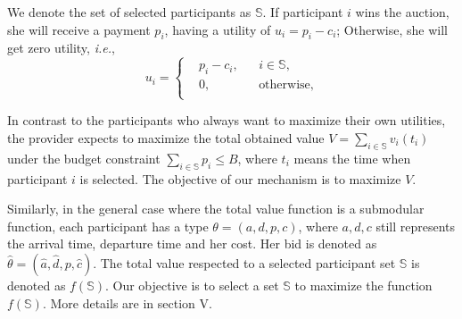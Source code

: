 \documentclass[conference,compsocconf,letterpaper,10pt]{IEEEtran}
\newcommand{\ie}{{\em i.e.}}
\begin{document}

We denote the set of selected participants as $\mathbb{S}$. If participant $i$ wins the auction, she will receive a payment $p_i$, having a utility of $u_i=p_i-c_i$; Otherwise, she will get zero utility, \ie,
\begin{equation}\label{equ:utilityfunction}
u_i=\left\{
\begin{aligned}
&p_i-c_i, & & i\in \mathbb{S},\\
&0, & & \text{otherwise},\\
\end{aligned}
\right.
\end{equation}

In contrast to the participants who always want to maximize their own utilities, the provider expects to maximize the total obtained value $V=\sum_{i\in\mathbb{S}}v_i(t_i)$ under the budget constraint $\sum_{i\in\mathbb{S}}p_i \le B$, where $t_i$ means the time when participant $i$ is selected. The objective of our mechanism is to maximize $V$.

Similarly, in the general case where the total value function is a submodular function, each participant has a type $\theta = (a,d,p,c)$, where $a,d,c$ still represents the arrival time, departure time and her cost. Her bid is denoted as $\hat{\theta}=(\hat{a},\hat{d},p,\hat{c})$. The total value respected to a selected participant set $\mathbb{S}$ is denoted as $f(\mathbb{S})$. Our objective is to select a set $\mathbb{S}$ to maximize the function $f(\mathbb{S})$. More details are in section V.
\end{document}
